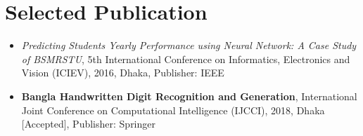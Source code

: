 \documentclass[]{deedy-resume-openfont}
\begin{document}
\begin{minipage}[t]{0.66\textwidth}
\section{Selected Publication}
\begin{itemize}
	\item \textit{Predicting Students Yearly Performance using Neural Network: A Case Study of BSMRSTU}, 5th International Conference on Informatics, Electronics and Vision (ICIEV), 2016, Dhaka, Publisher: IEEE
	\item \textbf{Bangla Handwritten Digit Recognition and Generation}, International Joint Conference on Computational Intelligence (IJCCI), 2018, Dhaka [Accepted], Publisher: Springer
\end{itemize}
\sectionsep

%

%



\end{minipage}
\end{document}
